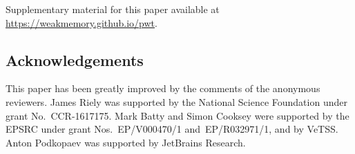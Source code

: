 




Supplementary material for this paper available at
\url{https://weakmemory.github.io/pwt}.

\subsection*{Acknowledgements}
This paper has been greatly improved by the comments of the anonymous reviewers.
%
James Riely was supported by the National Science Foundation under
grant No.~CCR-1617175.
%
Mark Batty and Simon Cooksey were supported by the EPSRC under grant
Nos.~EP/V000470/1 and~EP/R032971/1, and by VeTSS.
%
Anton Podkopaev was supported by JetBrains Research.



